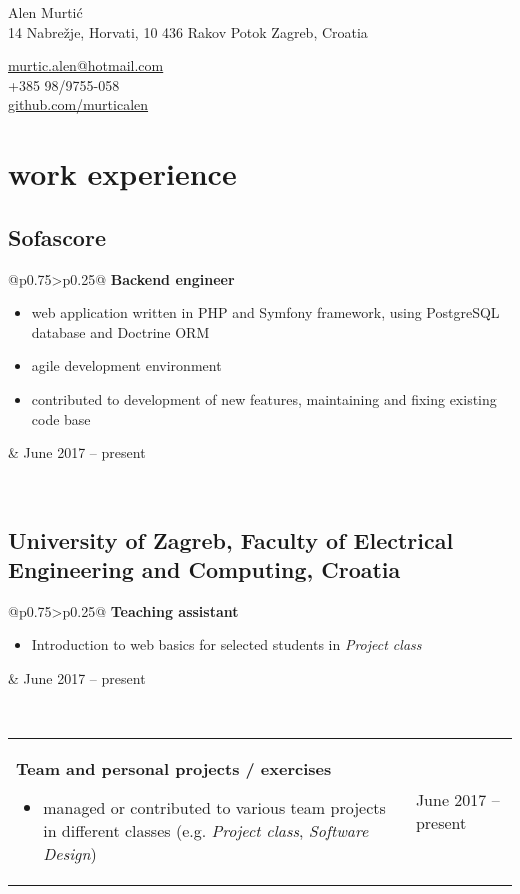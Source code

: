 \documentclass[a4paper]{article}
\makeatletter
\newlength{\tablewidth}
\newenvironment{period}[2]{%
\newcommand{\sarma}{#2}%
\setlength{\tablewidth}{\linewidth}
\addtolength{\tablewidth}{-2\tabcolsep}
\begin{tabular}{@{}p{0.75\tablewidth}>{\raggedleft\arraybackslash}p{0.25\tablewidth}@{}}%
#1 \newline
\begin{itemize}
}{%
\end{itemize} & \sarma \\%
\end{tabular}\\
}
\makeatother
\begin{document}
\fontfamily{\sfdefault}
\selectfont

\begin{minipage}{.5\textwidth}
\LARGE{Alen Murtić}\\
\normalsize{14 Nabrežje, Horvati, 10 436 Rakov Potok
	\newline
	Zagreb, Croatia}
\end{minipage}%
\begin{minipage}{.5\textwidth}
\raggedleft
\href{mailto:murtic.alen@hotmail.com}{murtic.alen@hotmail.com} \\
+385 98/9755-058 \\
\href{https://github.com/murticalen}{github.com/murticalen}
\end{minipage}

\vspace{1em}

\section{work experience}

\subsection{Sofascore}
\begin{period}{\textbf{Backend engineer}}{June 2017 -- present}
    \item web application written in PHP and Symfony framework, using PostgreSQL database and Doctrine ORM
    \item agile development environment
    \item contributed to development of new features, maintaining and fixing existing code base
\end{period}

\subsection{University of Zagreb, Faculty of Electrical Engineering and Computing, Croatia}
\begin{period}{\textbf{Teaching assistant}}{Oct 2016 -- Nov 2016}
	\item Introduction to web basics for selected students in \textit{Project class}
\end{period}
\begin{period}{\textbf{Team and personal projects / exercises}}{}
	\item managed or contributed to various team projects in different classes (e.g. \textit{Project class}, \textit{Software Design})
\end{period}
\end{document}
